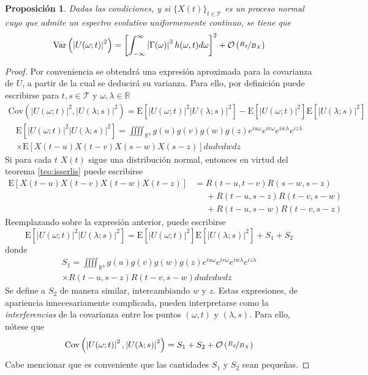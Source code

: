 \documentclass[12pt,letterpaper]{book}
\newtheorem{proposicion}[teorema]{Proposición}
\newcommand{\R}{\mathbb{R}}
\newcommand{\intR}{\int_{-\infty}^{\infty}}
\newcommand{\E}[1]{\mathrm{E}\left[ #1 \right]}
\newcommand{\Var}[1]{\mathrm{Var}\left( #1 \right)}
\newcommand{\Cov}[1]{\mathrm{Cov}\left( #1 \right)}
\newcommand{\abso}[1]{\left| #1 \right|}
\newcommand{\xt}{$\{X(t)\}_{t\in \mathcal{T}}$ }
\newcommand{\orden}[1]{\mathcal{O}\left( #1 \right)}
\newcommand{\pheq}{\phantom{=}}
\begin{document}
\begin{proposicion}
Dadas las condiciones, y si \xt es un proceso normal cuyo que admite un espectro evolutivo uniformemente continuo, se tiene que
\begin{equation}
\Var{\abso{U(\omega;t)}^{2}} = \left[ \intR \abso{\Gamma(\omega)}^{2} h(\omega, t)d\omega \right]^{2} + \orden{\nicefrac{B_g}{B_X}}
\end{equation}
\end{proposicion}


\begin{proof}
Por conveniencia se obtendrá una expresión aproximada para la covarianza de $U$, a partir de la cual se deducirá su varianza. 
%
Para ello, por definición puede escribirse para $t,s \in \mathcal{T}$ y $\omega, \lambda \in \R$
\begin{align*}
\Cov{\abso{U(\omega;t)}^{2},\abso{U(\lambda;s)}^{2}} =
\E{\abso{U(\omega;t)}^{2} \abso{U(\lambda;s)}^{2}} - 
\E{\abso{U(\omega;t)}^{2}} \E{\abso{U(\lambda;s)}^{2}}
\end{align*}
\begin{multline}
\E{\abso{U(\omega;t)}^{2} \abso{U(\lambda;s)}^{2}}
=
\iiiint_{\R^{4}} g(u) g(v) g(w) g(z) e^{i u \omega} e^{i v \omega} e^{i w \lambda} e^{i z \lambda} \\
 \times
\E{{X(t-u)} {X(t-v)} {X(s-w)} {X(s-z)}}
du dv dw dz 
\end{multline}
Si para cada $t$ $X(t)$ sigue una distribución normal, entonces en virtud del teorema \ref{teo:isserlis} puede escribirse
\begin{align*}
\E{X(t-u) {X(t-v)} {X(t-w)} X(t-z)} 
&=       R(t-u,t-v)R(s-w,s-z) \\
&\pheq + R(t-u,s-z)R(t-v,s-w) \\
&\pheq + R(t-u,s-w)R(t-v,s-z)
\end{align*}
Reemplazando sobre la expresión anterior, puede escribirse
\begin{equation}
\E{\abso{U(\omega;t)}^{2} \abso{U(\lambda;s)}^{2}} = \E{\abso{U(\omega;t)}^{2}} \E{\abso{U(\lambda;s)}^{2}}+ S_1 + S_2
\end{equation}
donde
\begin{multline*}
S_1 = \iiiint_{\R^{4}} g(u) g(v) g(w) g(z) e^{i u \omega} e^{i v \omega} e^{i w \lambda} e^{i z \lambda} \\
\times
R(t-u,s-z)R(t-v,s-w)
du dv dw dz 
\end{multline*}
Se define a $S_2$ de manera similar, intercambiando $w$ y $z$. 
%
Estas expresiones, de apariencia innecesariamente complicada, pueden interpretarse como la \textit{interferencias} de la covarianza entre los puntos $(\omega, t)$ y $(\lambda,s)$.
%
Para ello, nótese que
\begin{equation}
\Cov{\abso{U(\omega;t)}^{2},\abso{U(\lambda;s)}^{2}} = S_1 + S_2 + \orden{\nicefrac{B_g}{B_X}}
\end{equation}
%
Cabe mencionar que es conveniente que las cantidades $S_1$ y $S_2$ sean pequeñas.


\end{proof}
\end{document}
